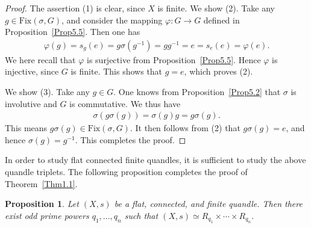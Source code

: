 \documentclass[12pt]{amsart}
\newtheorem{Prop}{Proposition}[section]
\theoremstyle{definition}
\begin{document}
\begin{proof}
The assertion (1) is clear, since $ X $ is finite. We show (2). Take any $ g \in {\mathrm{Fix}}(\sigma,G) $, and consider the mapping $ \varphi : G \rightarrow G $ defined in Proposition~\ref{Prop5.5}. Then one has
\begin{align*}
\varphi(g) = s_{g}(e) = g \sigma (g^{-1}) = g g^{-1} = e = s_{e}(e) = \varphi(e).
\end{align*}
We here recall that $ \varphi $ is surjective from Proposition~\ref{Prop5.5}. Hence $ \varphi $ is injective, since $ G $ is finite. This shows that $ g = e $, which proves (2).

We show (3). Take any $ g \in G $. One knows from Proposition~\ref{Prop5.2} that $ \sigma $ is involutive and $ G $ is commutative. We thus have
\begin{align*}
\sigma(g \sigma(g)) = \sigma(g)g = g \sigma(g).
\end{align*}
This means $ g \sigma(g) \in {\mathrm{Fix}}(\sigma,G) $. It then follows from (2) that $ g \sigma(g) = e $, and hence $ \sigma(g) = g^{-1} $. This completes the proof.
\end{proof}

In order to study flat connected finite quandles, it is sufficient to study the above quandle triplets. The following proposition completes the proof of Theorem~\ref{Thm1.1}.

\begin{Prop}\label{Prop6.3}
Let $ (X,s) $ be a flat, connected, and finite quandle. Then there exist odd prime powers $ q_{1}, \ldots, q_{n} $ such that $ (X,s) \simeq R_{q_{1}} \times \cdots \times R_{q_{n}} $.
\end{Prop}
\end{document}
